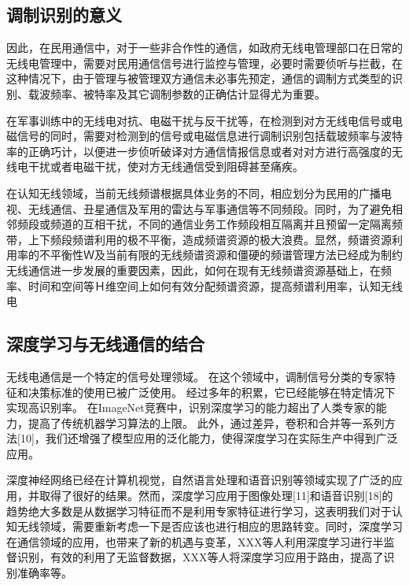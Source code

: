 \subsection{调制识别的意义}
因此，在民用通信中，对于一些非合作性的通信，如政府无线电管理部口在日常的无线电管理中，需要对民用通信信号进行监控与管理，必要时需要侦听与拦截，在这种情况下，由于管理与被管理双方通信未必事先预定，通信的调制方式类型的识别、载波频率、被特率及其它调制参数的正确估计显得尤为重要。\par

在军事训练中的无线电对抗、电磁干扰与反干扰等，在检测到对方无线电信号或电磁信号的同时，需要对检测到的信号或电磁信息进行调制识别包括载玻频率与波特率的正确巧计，以便进一步侦听破译对方通信情报信息或者对对方进行高强度的无线电干扰或者电磁干扰，使对方无线通信受到阻碍甚至痛疾。\par

在认知无线领域，当前无线频谱根据具体业务的不同，相应划分为民用的广播电视、无线通信、丑星通信及军用的雷达与军事通信等不同频段。同时，为了避免相邻频段或频道的互相干扰，不同的通信业务工作频段相互隔离并且预留一定隔离频带，上下频段频谱利用的极不平衡，造成频谱资源的极大浪费。显然，频谱资源利用率的不平衡性Ｗ及当前有限的无线频谱资源和僵硬的频谱管理方法已经成为制约无线通信进一步发展的重要因素，因此，如何在现有无线频谱资源基础上，在频率、时间和空间等Ｈ维空间上如何有效分配频谱资源，提高频谱利用率，认知无线电\par

\subsection{深度学习与无线通信的结合}

无线电通信是一个特定的信号处理领域。 在这个领域中，调制信号分类的专家特征和决策标准的使用已被广泛使用。 经过多年的积累，它已经能够在特定情况下实现高识别率。 在ImageNet竞赛中，识别深度学习的能力超出了人类专家的能力，提高了传统机器学习算法的上限。 此外，通过差异，卷积和合并等一系列方法[10]，我们还增强了模型应用的泛化能力，使得深度学习在实际生产中得到广泛应用。\par

深度神经网络已经在计算机视觉，自然语言处理和语音识别等领域实现了广泛的应用，并取得了很好的结果。然而，深度学习应用于图像处理[11]和语音识别[18]的趋势绝大多数是从数据学习特征而不是利用专家特征进行学习，这表明我们对于认知无线领域，需要重新考虑一下是否应该也进行相应的思路转变。同时，深度学习在通信领域的应用，也带来了新的机遇与变革，XXX等人利用深度学习进行半监督识别，有效的利用了无监督数据，XXX等人将深度学习应用于路由，提高了识别准确率等。\par

